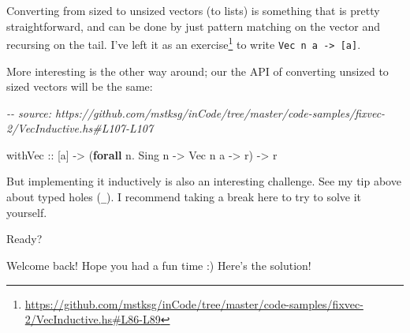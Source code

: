 \documentclass[]{article}
\newenvironment{Shaded}{}{}
\newcommand{\CommentTok}[1]{\textcolor[rgb]{0.38,0.63,0.69}{\textit{#1}}}
\newcommand{\DataTypeTok}[1]{\textcolor[rgb]{0.56,0.13,0.00}{#1}}
\newcommand{\KeywordTok}[1]{\textcolor[rgb]{0.00,0.44,0.13}{\textbf{#1}}}
\newcommand{\NormalTok}[1]{#1}
\newcommand{\OperatorTok}[1]{\textcolor[rgb]{0.40,0.40,0.40}{#1}}
\newcommand{\OtherTok}[1]{\textcolor[rgb]{0.00,0.44,0.13}{#1}}
\renewcommand{\href}[2]{#2\footnote{\url{#1}}}
\begin{document}
Converting from sized to unsized vectors (to lists) is something that is pretty
straightforward, and can be done by just pattern matching on the vector and
recursing on the tail. I've
\href{https://github.com/mstksg/inCode/tree/master/code-samples/fixvec-2/VecInductive.hs\#L86-L89}{left
it as an exercise} to write \texttt{Vec\ n\ a\ -\textgreater{}\ {[}a{]}}.

More interesting is the other way around; our the API of converting unsized to
sized vectors will be the same:

\begin{Shaded}
\begin{Highlighting}[]
\CommentTok{{-}{-} source: https://github.com/mstksg/inCode/tree/master/code{-}samples/fixvec{-}2/VecInductive.hs\#L107{-}L107}

\OtherTok{withVec ::}\NormalTok{ [a] }\OtherTok{{-}>}\NormalTok{ (}\KeywordTok{forall}\NormalTok{ n}\OperatorTok{.} \DataTypeTok{Sing}\NormalTok{ n }\OtherTok{{-}>} \DataTypeTok{Vec}\NormalTok{ n a }\OtherTok{{-}>}\NormalTok{ r) }\OtherTok{{-}>}\NormalTok{ r}
\end{Highlighting}
\end{Shaded}

But implementing it inductively is also an interesting challenge. See my tip
above about typed holes (\texttt{\_}). I recommend taking a break here to try to
solve it yourself.

Ready?

Welcome back! Hope you had a fun time :) Here's the solution!

\begin{Shaded}
\end{Shaded}
\end{document}
